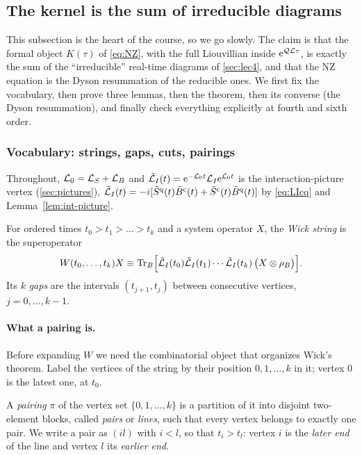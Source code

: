 \subsection{The kernel is the sum of irreducible diagrams}
\label{sec:nz-irreducible}

This subsection is the heart of the course, so we go slowly.
The claim is that the formal object $K(\tau)$ of \cref{eq:NZ}, with the full Liouvillian inside $\mathrm{e}^{\mathcal{Q}\mathcal{L}\tau}$, is exactly the sum of the ``irreducible'' real-time diagrams of \cref{sec:lec4}, and that the NZ equation is the Dyson resummation of the reducible ones.
We first fix the vocabulary, then prove three lemmas, then the theorem, then its converse (the Dyson resummation), and finally check everything explicitly at fourth and sixth order.

\subsubsection{Vocabulary: strings, gaps, cuts, pairings}

Throughout, $\mathcal{L}_0=\mathcal{L}_S+\mathcal{L}_B$ and $\tilde{\mathcal{L}}_I(t)=\mathrm{e}^{-\mathcal{L}_0t}\mathcal{L}_I\mathrm{e}^{\mathcal{L}_0t}$ is the interaction-picture vertex (\cref{sec:pictures}), $\tilde{\mathcal{L}}_I(t)=-i[\tilde S^{\mathrm{q}}(t)\tilde B^{\mathrm{c}}(t)+\tilde S^{\mathrm{c}}(t)\tilde B^{\mathrm{q}}(t)]$ by \cref{eq:LIcq} and Lemma~\ref{lem:int-picture}.

\begin{definition}
For ordered times $t_0>t_1>\dots>t_{k}$ and a system operator $X$, the \emph{Wick string} is the superoperator
\begin{equation}
  W(t_0,\dots,t_k)X\equiv\operatorname{Tr}_B\!\Big[\tilde{\mathcal{L}}_I(t_0)\tilde{\mathcal{L}}_I(t_1)\cdots\tilde{\mathcal{L}}_I(t_k)\,\big(X\otimes\rho_{B}\big)\Big].
  \label{eq:wick-string}
\end{equation}
Its $k$ \emph{gaps} are the intervals $(t_{j+1},t_j)$ between consecutive vertices, $j=0,\dots,k-1$.
\end{definition}

\paragraph{What a pairing is.}
Before expanding $W$ we need the combinatorial object that organizes Wick's theorem.
Label the vertices of the string by their position $0,1,\dots,k$ in it; vertex $0$ is the latest one, at $t_0$.

\begin{definition}[Pairing]\label{def:pairing}
A \emph{pairing} $\pi$ of the vertex set $\{0,1,\dots,k\}$ is a partition of it into disjoint two-element blocks, called \emph{pairs} or \emph{lines}, such that every vertex belongs to exactly one pair.
We write a pair as $(il)$ with $i<l$, so that $t_i>t_l$: vertex $i$ is the \emph{later end} of the line and vertex $l$ its \emph{earlier end}.
\end{definition}

